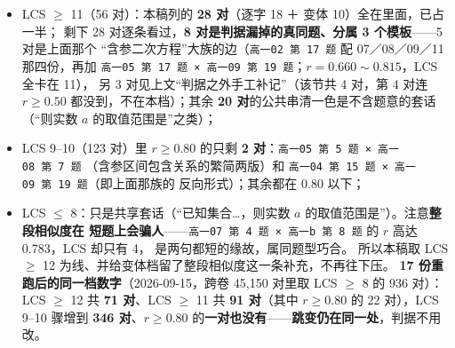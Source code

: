 \documentclass[a4paper,11pt]{article}
\providecommand{\tightlist}{%
  \setlength{\itemsep}{0pt}\setlength{\parskip}{0pt}}
\begin{document}
\begin{itemize}
  \begin{itemize}
  \tightlist
  \item
    LCS $\geqslant$ 11（56 对）：本稿列的 \textbf{28 对}（逐字 18 ＋ 变体 10）全在里面，已占一半；
    剩下 28 对逐条看过，\textbf{8 对是判据漏掉的真同题、分属 3 个模板}------5 对是上面那个
    ``含参二次方程''大族的边（\texttt{高一02\ 第\ 17\ 题} 配 07／08／09／11 那四份，再加
    \texttt{高一05\ 第\ 17\ 题\ ×\ 高一09\ 第\ 19\ 题}；\(r=0.660\sim0.815\)，LCS 全卡在 11），
    另 3 对见上文``判据之外手工补记''（该节共 4 对，第 4 对连 \(r\ge 0.50\) 都没到，不在本档）；其余 \textbf{20 对}的公共串清一色是不含题意的套话
    （``则实数 \(a\) 的取值范围是''之类）；
  \item
    LCS 9--10（123 对）里 \(r\ge 0.80\) 的只剩 \textbf{2 对}：\texttt{高一05\ 第\ 5\ 题\ ×\ 高一08\ 第\ 7\ 题}
    （含参区间包含关系的繁简两版）和 \texttt{高一04\ 第\ 15\ 题\ ×\ 高一09\ 第\ 19\ 题}（即上面那族的
    反向形式）；其余都在 0.80 以下；
  \item
    LCS $\leqslant$ 8：只是共享套话（``已知集合\ldots，则实数 \(a\) 的取值范围是''）。注意\textbf{整段相似度在
    短题上会骗人}------\texttt{高一07\ 第\ 4\ 题\ ×\ 高一b\ 第\ 8\ 题} 的 \(r\) 高达 0.783，LCS 却只有 4，
    是两句都短的缘故，属同题型巧合。
    所以本稿取 LCS $\geqslant$ 12 为线、并给变体档留了整段相似度这一条补充，不再往下压。
    \textbf{17 份重跑后的同一档数字}（2026-09-15，跨卷 45,150 对里取 LCS $\geqslant$ 8 的 936 对）：
    LCS $\geqslant$ 12 共 \textbf{71 对}、LCS $\geqslant$ 11 共 \textbf{91 对}（其中 \(r\ge0.80\) 的 22 对），LCS 9--10 骤增到
    \textbf{346 对}、\(r\ge0.80\) 的\textbf{一对也没有}------\textbf{跳变仍在同一处}，判据不用改。
  \end{itemize}
\end{itemize}
\end{document}
